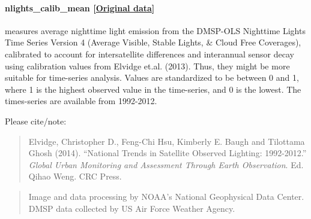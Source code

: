 \documentclass[]{book}
\begin{document}
\paragraph{nlights\_calib\_mean
{[}\href{http://ngdc.noaa.gov/eog/dmsp/downloadV4composites.html}{Original
data}{]}}\label{nlights-calib-mean}

measures average nighttime light emission from the DMSP-OLS Nighttime
Lights Time Series Version 4 (Average Visible, Stable Lights, \& Cloud
Free Coverages), calibrated to account for intersatellite differences
and interannual sensor decay using calibration values from Elvidge
et.al. (2013). Thus, they might be more suitable for time-series
analysis. Values are standardized to be between 0 and 1, where 1 is the
highest observed value in the time-series, and 0 is the lowest. The
times-series are available from 1992-2012.

Please cite/note:

\begin{quote}
Elvidge, Christopher D., Feng-Chi Hsu, Kimberly E. Baugh and Tilottama
Ghosh (2014). ``National Trends in Satellite Observed Lighting:
1992-2012.'' \emph{Global Urban Monitoring and Assessment Through Earth
Observation}. Ed. Qihao Weng. CRC Press.
\end{quote}

\begin{quote}
Image and data processing by NOAA's National Geophysical Data Center.
DMSP data collected by US Air Force Weather Agency.
\end{quote}
\end{document}
